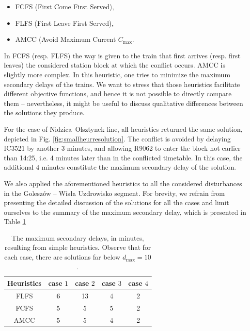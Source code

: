 \begin{itemize}
  \item FCFS (First Come First Served),
  \item FLFS (First Leave First Served),
  \item AMCC (Avoid Maximum Current $C_{\max}$.
\end{itemize}

In FCFS (resp. FLFS) the way is given to the train that first arrives (resp.
first leaves) the considered station block at which the conflict occurs. AMCC
is slightly more complex. In this heuristic, one tries to minimize the maximum
secondary delays of the trains. We want to stress that those heuristics
facilitate different objective functions, and hence it is not possible to directly
compare them -- nevertheless, it might be useful to discuss qualitative
differences between the solutions they produce.

For the case of Nidzica--Olsztynek line, all heuristics returned the same
solution, depicted in Fig. \ref{fig:smallheurresolution}. The conflict is
avoided by delaying IC3521 by another 3-minutes, and allowing R9062 to enter
the block not earlier than 14:25, i.e. 4 minutes later than in the conflicted
timetable. In this case, the additional 4 minutes constitute the maximum
secondary delay of the solution.

We also applied the aforementioned heuristics to all the considered
disturbances in the Goleszów -- Wisła Uzdrowisko segment. For brevity, we
refrain from presenting the detailed discussion of the solutions for all the
cases and limit ourselves to the summary of the maximum secondary delay, which
is presented in Table \ref{tab:simple}

\begin{table}[bh]
  \centering
  \begin{tabular}{ccccc}
    Heuristics & case $1$ & case $2$ & case $3$ & case $4$ \\
    \hline
    FLFS       & 6        & 13       & 4        & 2        \\
    \hline
    FCFS       & 5        & 5        & 5        & 2        \\
    \hline
    AMCC       & 5        & 5        & 4        & 2        \\
    \hline
  \end{tabular}
  \caption{The maximum secondary delays, in minutes, resulting from simple heuristics.
    Observe that for each case, there are solutions far below $d_{\text{max}} =
      10$.} \label{tab:simple}
\end{table}

